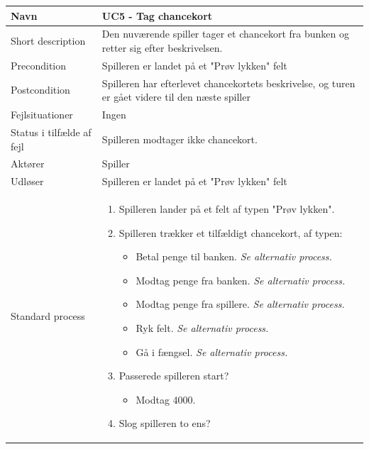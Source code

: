 \newpage
\begin{center}
\begin{longtable}{|l|p{11cm}|}
\hline
Navn &  UC5 - Tag chancekort\\
\hline
Short description & Den nuværende spiller tager et chancekort fra bunken og retter sig efter beskrivelsen. \\
\hline
Precondition & Spilleren er landet på et "Prøv lykken" felt \\
\hline
Postcondition & Spilleren har efterlevet chancekortets beskrivelse, og turen er gået videre til den næste spiller \\
\hline
Fejlsituationer & Ingen \\
\hline
Status i tilfælde af fejl & Spilleren modtager ikke chancekort. \\
\hline
Aktører & Spiller \\
\hline
Udløser & Spilleren er landet på et "Prøv lykken" felt \\
\hline
Standard process &  
\begin{minipage}[t]{1\textwidth}
  \begin{enumerate}
      \item Spilleren lander på et felt af typen "Prøv lykken".
      \item Spilleren trækker et tilfældigt chancekort, af typen:
      \begin{itemize}
          \item Betal penge til banken.\newline
          \emph{Se alternativ process.} 
          \item Modtag penge fra banken.\newline
          \emph{Se alternativ process.}
          \item Modtag penge fra spillere.\newline
          \emph{Se alternativ process.}
          \item Ryk felt.\newline
          \emph{Se alternativ process.}
          \item Gå i fængsel.\newline
          \emph{Se alternativ process.}
      \end{itemize}
      \item Passerede spilleren start?
      \begin{itemize}
          \item Modtag 4000. 
      \end{itemize}
      \item Slog spilleren to ens?

\end{enumerate}
\end{minipage}
\end{longtable}
\end{center}

